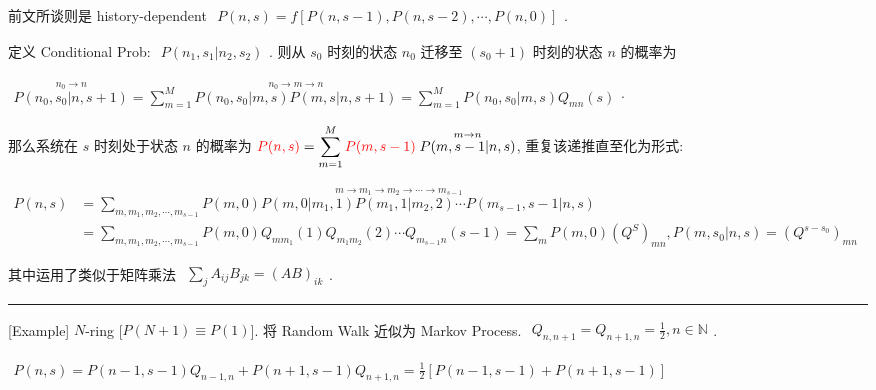 \documentclass[../../main.tex]{subfiles}
\begin{document}
前文所谈则是 history-dependent $\begin{aligned}
    P(n,s) = f[P(n,s-1),P(n,s-2),\cdots,P(n,0)]
\end{aligned}$. 

定义 Conditional Prob: $\begin{aligned}
    P(n_{1},s_{1}|n_{2},s_{2}) 
\end{aligned}$. 则从 $s_{0}$ 时刻的状态 $n_{0}$ 迁移至 $(s_{0}+1)$ 时刻的状态 $n$ 的概率为 

$\begin{aligned}
    \stackrel{n_{0}\rightarrow n}{P(n_{0},s_{0}|n,s+1)} = \sum_{m=1}^{M}\stackrel{n_{0}\rightarrow m\rightarrow n}{P(n_{0},s_{0}|m,s)P(m,s|n,s+1)} = \sum_{m=1}^{M}P(n_{0},s_{0}|m,s)Q_{mn}(s)
\end{aligned}$. 

那么系统在 $s$ 时刻处于状态 $n$ 的概率为 $\begin{aligned}
    {\color{red}{P(n,s)}} = \sum_{m=1}^{M}{\color{red}{P(m,s-1)}}\stackrel{m\rightarrow n}{P(m,s-1|n,s)}
\end{aligned}$, 重复该递推直至化为形式: 

$\begin{aligned}
    P(n,s) &= \sum_{m,m_{1},m_{2},\cdots,m_{s-1}}\stackrel{m\rightarrow m_{1}\rightarrow m_{2}\rightarrow \cdots\rightarrow m_{s-1}}{P(m,0)P(m,0|m_{1},1)P(m_{1},1|m_{2},2)\cdots P(m_{s-1},s-1|n,s)}\\
    &= \sum_{m,m_{1},m_{2},\cdots,m_{s-1}}P(m,0)Q_{mm_{1}}(1)Q_{m_{1}m_{2}}(2)\cdots Q_{m_{s-1}n}(s-1) = \sum_{m}P(m,0)\left(Q^{S}\right)_{mn},P(m,s_{0}|n,s) = (Q^{s-s_{0}})_{mn}
\end{aligned}$

其中运用了类似于矩阵乘法 $\begin{aligned}
    \sum_{j}A_{ij}B_{jk} = (AB)_{ik}
\end{aligned}$. 

\vspace{0.5em}\hrule\vspace{0.5em}

[Example] $N$-ring [$P(N+1)\equiv P(1)$]. 将 Random Walk 近似为 Markov Process. $\begin{aligned}
    Q_{n,n+1} = Q_{n+1,n} = \frac{1}{2},n\in\mathbb{N}
\end{aligned}$. 

$\begin{aligned}
    P(n,s) = P(n-1,s-1)Q_{n-1,n} + P(n+1,s-1)Q_{n+1,n} = \frac{1}{2}\left[P(n-1,s-1) + P(n+1,s-1)\right]
\end{aligned}$
\end{document}
